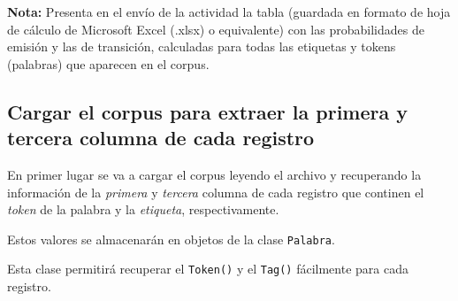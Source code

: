 \documentclass[12pt,a4paper,table]{article}
\begin{document}
\textbf{Nota:} Presenta en el envío de la actividad la tabla (guardada
en formato de hoja de cálculo de Microsoft Excel (.xlsx) o equivalente)
con las probabilidades de emisión y las de transición, calculadas para
todas las etiquetas y tokens (palabras) que aparecen en el corpus.
    \hypertarget{cargar-el-corpus-para-extraer-la-primera-y-tercera-columna-de-cada-registro}{%
\subsection*{Cargar el corpus para extraer la primera y tercera
columna de cada
registro}\label{cargar-el-corpus-para-extraer-la-primera-y-tercera-columna-de-cada-registro}}

En primer lugar se va a cargar el corpus leyendo el archivo y
recuperando la información de la \emph{primera} y \emph{tercera} columna
de cada registro que continen el \emph{token} de la palabra y la
\emph{etiqueta}, respectivamente.

Estos valores se almacenarán en objetos de la clase \texttt{Palabra}.

Esta clase permitirá recuperar el \texttt{Token()} y el \texttt{Tag()}
fácilmente para cada registro.
\end{document}
